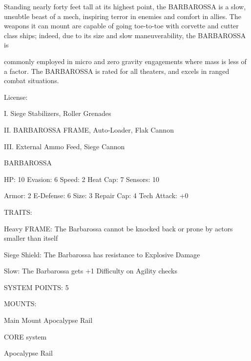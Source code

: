 Standing nearly forty feet tall at its highest point, the BARBAROSSA is a slow, unsubtle beast of a mech,  
inspiring terror in enemies and comfort in allies. The weapons it can mount are capable of going toe-to-toe  
with corvette and cutter class ships; indeed, due to its size and slow maneuverability, the BARBAROSSA is  

                                                                                                          


commonly employed in micro and zero gravity engagements where mass is less of a factor. The  
BARBAROSSA is rated for all theaters, and excels in ranged combat situations.   

                                                  License:
 
I. Siege Stabilizers, Roller Grenades
 
II. BARBAROSSA FRAME, Auto-Loader, Flak Cannon
 
III. External Ammo Feed, Siege Cannon
 

                                            BARBAROSSA 

 HP: 10         Evasion: 6                           Speed: 2           Heat Cap: 7       Sensors: 10 

 Armor:  2      E-Defense: 6                         Size: 3            Repair Cap: 4     Tech Attack:  
                                                                                          +0 

                                                  TRAITS: 

 Heavy FRAME: The Barbarossa cannot be knocked back or prone by actors smaller than itself
 
 Siege Shield: The Barbarossa has resistance to Explosive Damage
 
 Slow: The Barbarossa gets +1 Difficulty on Agility checks 

                                           SYSTEM POINTS: 5 

                                                 MOUNTS: 

 Main Mount                                          Apocalypse Rail 

                                              CORE system 

                                                                                                          


                                                Apocalypse Rail  

